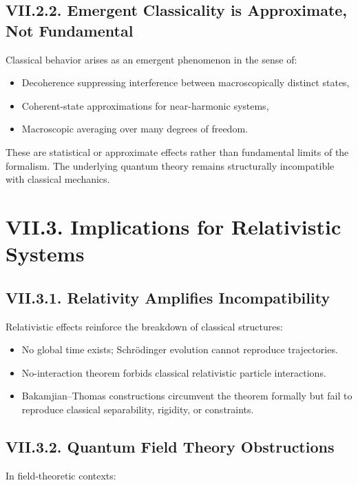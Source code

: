 \documentclass[12pt,oneside]{book}
\theoremstyle{plain}
\theoremstyle{definition}
\begin{document}
\subsection*{VII.2.2. Emergent Classicality is Approximate, Not Fundamental}

Classical behavior arises as an emergent phenomenon in the sense of:

\begin{itemize}
    \item Decoherence suppressing interference between macroscopically distinct states,
    \item Coherent-state approximations for near-harmonic systems,
    \item Macroscopic averaging over many degrees of freedom.
\end{itemize}

These are statistical or approximate effects rather than fundamental limits of the formalism. The underlying quantum theory remains structurally incompatible with classical mechanics.

\section{VII.3. Implications for Relativistic Systems}

\subsection*{VII.3.1. Relativity Amplifies Incompatibility}

Relativistic effects reinforce the breakdown of classical structures:

\begin{itemize}
    \item No global time exists; Schrödinger evolution cannot reproduce trajectories.
    \item No-interaction theorem forbids classical relativistic particle interactions.
    \item Bakamjian–Thomas constructions circumvent the theorem formally but fail to reproduce classical separability, rigidity, or constraints.
\end{itemize}

\subsection*{VII.3.2. Quantum Field Theory Obstructions}

In field-theoretic contexts:
\end{document}
